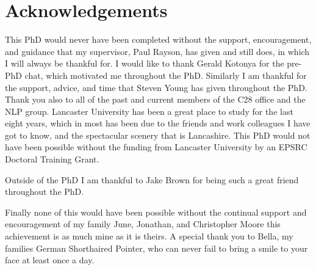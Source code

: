 \section*{\centering Acknowledgements}


This PhD would never have been completed without the support, encouragement, and guidance that my supervisor, Paul Rayson, has given and still does, in which I will always be thankful for. I would like to thank Gerald Kotonya for the pre-PhD chat, which motivated me throughout the PhD. Similarly I am thankful for the support, advice, and time that Steven Young has given throughout the PhD. Thank you also to all of the past and current members of the C28 office and the NLP group. Lancaster University has been a great place to study for the last eight years, which in most has been due to the friends and work colleagues I have got to know, and the spectacular scenery that is Lancashire. This PhD would not have been possible without the funding from Lancaster University by an EPSRC Doctoral Training Grant.

Outside of the PhD I am thankful to Jake Brown for being such a great friend throughout the PhD.

Finally none of this would have been possible without the continual support and encouragement of my family June, Jonathan, and Christopher Moore this achievement is as much mine as it is theirs. A special thank you to Bella, my families German Shorthaired Pointer, who can never fail to bring a smile to your face at least once a day.